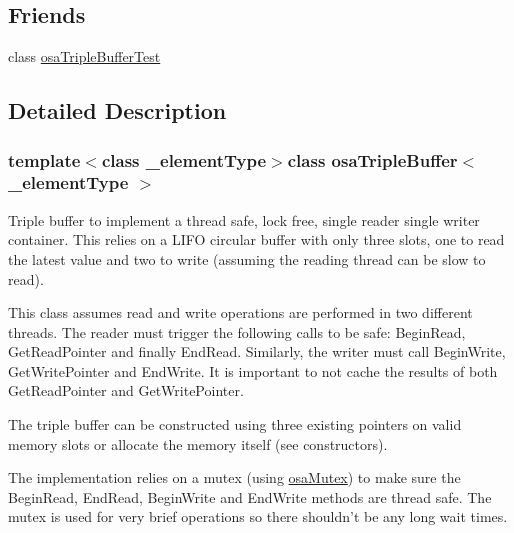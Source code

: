 \subsection*{Friends}
\begin{DoxyCompactItemize}
\item 
class \hyperlink{classosa_triple_buffer_aa5453762a45f68872c7b49a51f962e9c}{osa\-Triple\-Buffer\-Test}
\end{DoxyCompactItemize}


\subsection{Detailed Description}
\subsubsection*{template$<$class \-\_\-element\-Type$>$class osa\-Triple\-Buffer$<$ \-\_\-element\-Type $>$}

Triple buffer to implement a thread safe, lock free, single reader single writer container. This relies on a L\-I\-F\-O circular buffer with only three slots, one to read the latest value and two to write (assuming the reading thread can be slow to read).

This class assumes read and write operations are performed in two different threads. The reader must trigger the following calls to be safe\-: Begin\-Read, Get\-Read\-Pointer and finally End\-Read. Similarly, the writer must call Begin\-Write, Get\-Write\-Pointer and End\-Write. It is important to not cache the results of both Get\-Read\-Pointer and Get\-Write\-Pointer.

The triple buffer can be constructed using three existing pointers on valid memory slots or allocate the memory itself (see constructors).

The implementation relies on a mutex (using \hyperlink{classosa_mutex}{osa\-Mutex}) to make sure the Begin\-Read, End\-Read, Begin\-Write and End\-Write methods are thread safe. The mutex is used for very brief operations so there shouldn't be any long wait times. 

